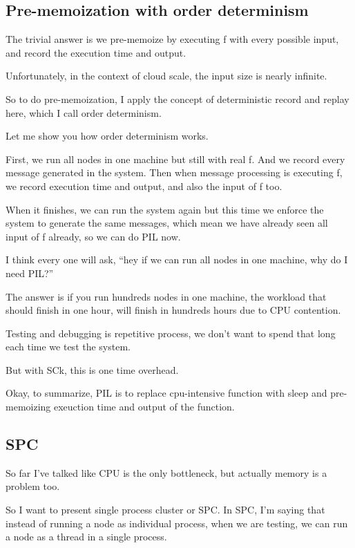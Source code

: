 \subsection{Pre-memoization with order determinism}

The trivial answer is we pre-memoize by executing f with every possible input,
and record the execution time and output.

Unfortunately, in the context of cloud scale, the input size is nearly infinite.

So to do pre-memoization, I apply the concept of deterministic record and
replay here, which I call order determinism.

Let me show you how order determinism works.

First, we run all nodes in one machine but still with real f. And we record
every message generated in the system. Then when message processing is executing
f, we record execution time and output, and also the input of f too.

When it finishes, we can run the system again but this time we enforce the
system to generate the same messages, which mean we have already seen all input
of f already, so we can do PIL now.

I think every one will ask, ``hey if we can run all nodes in one machine, why do
I need PIL?''

The answer is if you run hundreds nodes in one machine, the workload that should
finish in one hour, will finish in hundreds hours due to CPU contention.

Testing and debugging is repetitive process, we don't want to spend that long
each time we test the system.

But with SCk, this is one time overhead.

Okay, to summarize, PIL is to replace cpu-intensive function with sleep and
pre-memoizing exeuction time and output of the function.

\subsection{SPC}

So far I've talked like CPU is the only bottleneck, but actually memory is a
problem too.

So I want to present single process cluster or SPC. In SPC, I'm saying that
instead of running a node as individual process, when we are testing, we can run
a node as a thread in a single process.

